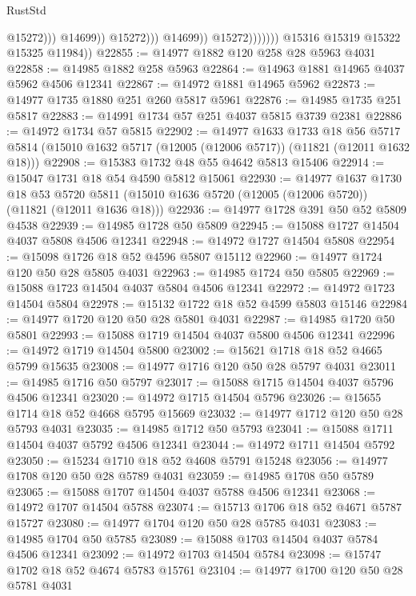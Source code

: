 \begin{lexlean}{RustStd}
\begin{coremodule}
                                          @15272)))
                                    @14699))
                                @15272)))
                          @14699))
                      @15272)))))))
        @15316
        @15319
        @15322
        @15325
        @11984))
@22855 := @14977 @1882 @120 @258 @28 @5963 @4031
@22858 := @14985 @1882 @258 @5963
@22864 := @14963 @1881 @14965 @4037 @5962 @4506 @12341
@22867 := @14972 @1881 @14965 @5962
@22873 := @14977 @1735 @1880 @251 @260 @5817 @5961
@22876 := @14985 @1735 @251 @5817
@22883 := @14991 @1734 @57 @251 @4037 @5815 @3739 @2381
@22886 := @14972 @1734 @57 @5815
@22902 := @14977
    @1633
    @1733
    @18
    @56
    @5717
    @5814
    (@15010 @1632 @5717 (@12005 (@12006 @5717)) (@11821 (@12011 @1632 @18)))
@22908 := @15383 @1732 @48 @55 @4642 @5813 @15406
@22914 := @15047 @1731 @18 @54 @4590 @5812 @15061
@22930 := @14977
    @1637
    @1730
    @18
    @53
    @5720
    @5811
    (@15010 @1636 @5720 (@12005 (@12006 @5720)) (@11821 (@12011 @1636 @18)))
@22936 := @14977 @1728 @391 @50 @52 @5809 @4538
@22939 := @14985 @1728 @50 @5809
@22945 := @15088 @1727 @14504 @4037 @5808 @4506 @12341
@22948 := @14972 @1727 @14504 @5808
@22954 := @15098 @1726 @18 @52 @4596 @5807 @15112
@22960 := @14977 @1724 @120 @50 @28 @5805 @4031
@22963 := @14985 @1724 @50 @5805
@22969 := @15088 @1723 @14504 @4037 @5804 @4506 @12341
@22972 := @14972 @1723 @14504 @5804
@22978 := @15132 @1722 @18 @52 @4599 @5803 @15146
@22984 := @14977 @1720 @120 @50 @28 @5801 @4031
@22987 := @14985 @1720 @50 @5801
@22993 := @15088 @1719 @14504 @4037 @5800 @4506 @12341
@22996 := @14972 @1719 @14504 @5800
@23002 := @15621 @1718 @18 @52 @4665 @5799 @15635
@23008 := @14977 @1716 @120 @50 @28 @5797 @4031
@23011 := @14985 @1716 @50 @5797
@23017 := @15088 @1715 @14504 @4037 @5796 @4506 @12341
@23020 := @14972 @1715 @14504 @5796
@23026 := @15655 @1714 @18 @52 @4668 @5795 @15669
@23032 := @14977 @1712 @120 @50 @28 @5793 @4031
@23035 := @14985 @1712 @50 @5793
@23041 := @15088 @1711 @14504 @4037 @5792 @4506 @12341
@23044 := @14972 @1711 @14504 @5792
@23050 := @15234 @1710 @18 @52 @4608 @5791 @15248
@23056 := @14977 @1708 @120 @50 @28 @5789 @4031
@23059 := @14985 @1708 @50 @5789
@23065 := @15088 @1707 @14504 @4037 @5788 @4506 @12341
@23068 := @14972 @1707 @14504 @5788
@23074 := @15713 @1706 @18 @52 @4671 @5787 @15727
@23080 := @14977 @1704 @120 @50 @28 @5785 @4031
@23083 := @14985 @1704 @50 @5785
@23089 := @15088 @1703 @14504 @4037 @5784 @4506 @12341
@23092 := @14972 @1703 @14504 @5784
@23098 := @15747 @1702 @18 @52 @4674 @5783 @15761
@23104 := @14977 @1700 @120 @50 @28 @5781 @4031

\end{coremodule}
\end{lexlean}
